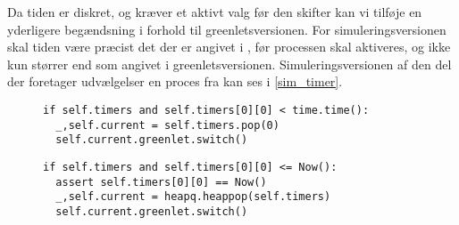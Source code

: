 Da tiden er diskret, og kræver et aktivt valg før den skifter kan vi tilføje en yderligere begændsning i forhold til greenletsversionen. For simuleringsversionen skal tiden være præcist det der er angivet i , før processen skal aktiveres, og ikke kun størrer end som angivet i greenletsversionen.  Simuleringsversionen af den del der foretager udvælgelser en proces fra   kan ses i \cref{sim_timer}. 

\begin{figure}[hbtp]
\begin{minipage}[c]{\linewidth}
\begin{lstlisting}[firstnumber=204, label=sched_timer, caption=Udvælgelse af proces fra listen timers (fra scheduling.py)]
if self.timers and self.timers[0][0] < time.time():
  _,self.current = self.timers.pop(0)
  self.current.greenlet.switch()
\end{lstlisting}
\end{minipage}
\begin{minipage}[c]{\linewidth}
\begin{lstlisting}[firstnumber=124, label=sim_timer, caption=Udvælgelse af proces fra listen timers (fra simulation.py)]
if self.timers and self.timers[0][0] <= Now():
  assert self.timers[0][0] == Now()
  _,self.current = heapq.heappop(self.timers)
  self.current.greenlet.switch()
\end{lstlisting}
\end{minipage}
\end{figure}



